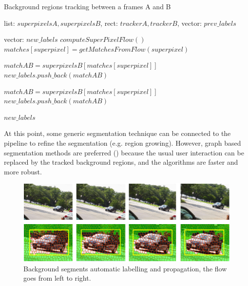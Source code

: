 \begin{algorithm}[ht]
\caption{Background regions tracking between a frames A and B}
\label{algo1}
\begin{algorithmic}
\REQUIRE list: $superpixelsA, superpixelsB$, rect: $trackerA, trackerB$, vector: $prev\_labels$

\STATE vector: $new\_labels$
\STATE $computeSuperPixelFlow()$
    \STATE $matches[superpixel] = getMatchesFromFlow(superpixel)$

		\STATE $matchAB = superpixelsB[ matches[superpixel] ]$
    			\STATE $new\_labels.push\_back( matchAB )$
    		\ENDIF
	\ENDIF 

    	    \STATE $matchAB = superpixelsB[ matches[superpixel] ]$
    			\STATE $new\_labels.push\_back( matchAB )$
    		\ENDIF
    	\ENDIF
\ENDFOR

\RETURN $new\_labels$
\end{algorithmic}
\end{algorithm}

At this point, some generic segmentation technique can be connected to the pipeline to refine the segmentation (e.g. region growing). However, graph based segmentation methods are preferred (\cite{c18}\cite{c15}) because the usual user interaction can be replaced by the tracked background regions, and the algorithms are faster and more robust.

   \begin{figure}[thpb]
      \centering
      \includegraphics[width=1\textwidth]{../images/suppixflow2.png}
      \caption{Background segments automatic labelling and propagation, the flow goes from left to right.}
      \label{figurelabel_spflow}
   \end{figure}

